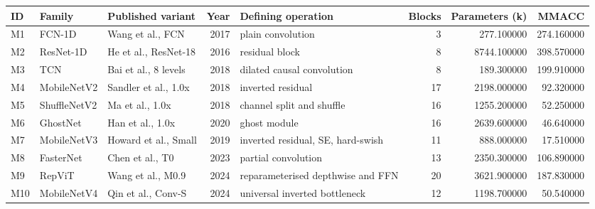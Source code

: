 \begin{tabular}{lllrlrrr}
\toprule
ID & Family & Published variant & Year & Defining operation & Blocks & Parameters (k) & MMACC \\
\midrule
M1 & FCN-1D & Wang et al., FCN & 2017 & plain convolution & 3 & 277.100000 & 274.160000 \\
M2 & ResNet-1D & He et al., ResNet-18 & 2016 & residual block & 8 & 8744.100000 & 398.570000 \\
M3 & TCN & Bai et al., 8 levels & 2018 & dilated causal convolution & 8 & 189.300000 & 199.910000 \\
M4 & MobileNetV2 & Sandler et al., 1.0x & 2018 & inverted residual & 17 & 2198.000000 & 92.320000 \\
M5 & ShuffleNetV2 & Ma et al., 1.0x & 2018 & channel split and shuffle & 16 & 1255.200000 & 52.250000 \\
M6 & GhostNet & Han et al., 1.0x & 2020 & ghost module & 16 & 2639.600000 & 46.640000 \\
M7 & MobileNetV3 & Howard et al., Small & 2019 & inverted residual, SE, hard-swish & 11 & 888.000000 & 17.510000 \\
M8 & FasterNet & Chen et al., T0 & 2023 & partial convolution & 13 & 2350.300000 & 106.890000 \\
M9 & RepViT & Wang et al., M0.9 & 2024 & reparameterised depthwise and FFN & 20 & 3621.900000 & 187.830000 \\
M10 & MobileNetV4 & Qin et al., Conv-S & 2024 & universal inverted bottleneck & 12 & 1198.700000 & 50.540000 \\
\bottomrule
\end{tabular}
